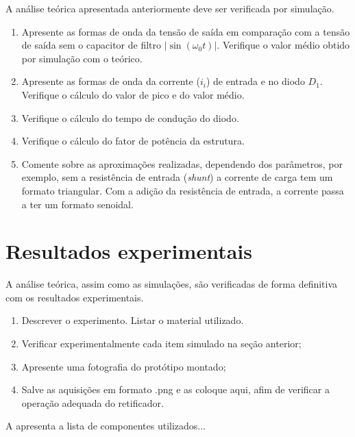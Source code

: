 A análise teórica apresentada anteriormente deve ser verificada por simulação.
\begin{enumerate}									
	\item   Apresente as formas de onda da tensão de saída em comparação com a tensão de saída sem o capacitor de filtro $|\sin(\omega_0 t)|$. Verifique o valor médio obtido por simulação com o teórico.
	\item   Apresente as formas de onda da corrente ($i_i$) de entrada e no diodo $D_1$. Verifique o cálculo do valor de pico e do valor médio.
	\item   Verifique o cálculo do tempo de condução do diodo.
	\item   Verifique o cálculo do fator de potência da estrutura.
	\item  Comente sobre as aproximações realizadas, dependendo dos parâmetros, por exemplo, sem a resistência de entrada (\emph{shunt}) a corrente de carga tem um formato triangular. Com a adição da resistência de entrada, a corrente passa a ter um formato senoidal.
\end{enumerate}





\section{Resultados experimentais}


A análise teórica, assim como as simulações, são verificadas de forma definitiva com os resultados experimentais.
\begin{enumerate}									
	\item   Descrever o experimento. Listar o material utilizado.  
	\item  Verificar experimentalmente cada item simulado na seção anterior;
	\item  Apresente uma fotografia do protótipo montado;
	\item  Salve as aquisições em formato .png e as coloque aqui, afim de verificar a operação adequada do retificador.
\end{enumerate}

A  apresenta a lista de componentes utilizados...

